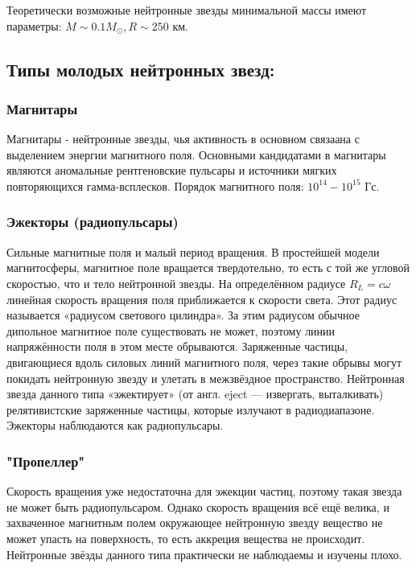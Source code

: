 Теоретически возможные нейтронные звезды минимальной массы имеют параметры: $M \sim 0.1 M_\odot, R \sim 250 $ км.

\medskip

\subsection{Типы молодых нейтронных звезд: }

\subsubsection{Магнитары}

Магнитары - нейтронные звезды, чья активность в основном связаана с выделением энергии магнитного поля. Основными кандидатами в магнитары являются аномальные рентгеновские пульсары и источники мягких повторяющихся гамма-всплесков. Порядок магнитного поля: $10^{14}-10^{15}$ Гс.

\subsubsection{Эжекторы (радиопульсары)}
Сильные магнитные поля и малый период вращения. В простейшей модели магнитосферы, магнитное поле вращается твердотельно, то есть с той же угловой скоростью, что и тело нейтронной звезды. На определённом радиусе $ R_{L}=c\omega$ линейная скорость вращения поля приближается к скорости света. Этот радиус называется «радиусом светового цилиндра». За этим радиусом обычное дипольное магнитное поле существовать не может, поэтому линии напряжённости поля в этом месте обрываются. Заряженные частицы, двигающиеся вдоль силовых линий магнитного поля, через такие обрывы могут покидать нейтронную звезду и улетать в межзвёздное пространство. Нейтронная звезда данного типа «эжектирует» (от англ. eject — извергать, выталкивать) релятивистские заряженные частицы, которые излучают в радиодиапазоне. Эжекторы наблюдаются как радиопульсары.
\subsubsection{"Пропеллер"}

Скорость вращения уже недостаточна для эжекции частиц, поэтому такая звезда не может быть радиопульсаром. Однако скорость вращения всё ещё велика, и захваченное магнитным полем окружающее нейтронную звезду вещество не может упасть на поверхность, то есть аккреция вещества не происходит. Нейтронные звёзды данного типа практически не наблюдаемы и изучены плохо.

